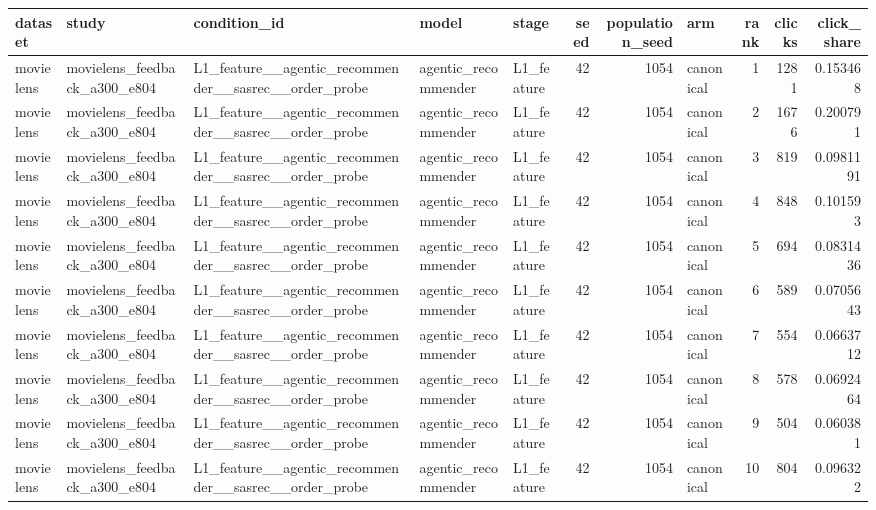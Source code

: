 \begin{table}[htbp!]
\centering
\small
\setlength{\tabcolsep}{3pt}
\renewcommand{\arraystretch}{1.1}
\begin{tabular}{lllllrrlrrr}
\hline
dataset & study & condition\_id & model & stage & seed & population\_seed & arm & rank & clicks & click\_share \\
\hline
movielens & movielens\_feedback\_a300\_e804 & L1\_feature\_\_agentic\_recommender\_\_sasrec\_\_order\_probe & agentic\_recommender & L1\_feature & 42 & 1054 & canonical & 1 & 1281 & 0.153468 \\
movielens & movielens\_feedback\_a300\_e804 & L1\_feature\_\_agentic\_recommender\_\_sasrec\_\_order\_probe & agentic\_recommender & L1\_feature & 42 & 1054 & canonical & 2 & 1676 & 0.200791 \\
movielens & movielens\_feedback\_a300\_e804 & L1\_feature\_\_agentic\_recommender\_\_sasrec\_\_order\_probe & agentic\_recommender & L1\_feature & 42 & 1054 & canonical & 3 & 819 & 0.0981191 \\
movielens & movielens\_feedback\_a300\_e804 & L1\_feature\_\_agentic\_recommender\_\_sasrec\_\_order\_probe & agentic\_recommender & L1\_feature & 42 & 1054 & canonical & 4 & 848 & 0.101593 \\
movielens & movielens\_feedback\_a300\_e804 & L1\_feature\_\_agentic\_recommender\_\_sasrec\_\_order\_probe & agentic\_recommender & L1\_feature & 42 & 1054 & canonical & 5 & 694 & 0.0831436 \\
movielens & movielens\_feedback\_a300\_e804 & L1\_feature\_\_agentic\_recommender\_\_sasrec\_\_order\_probe & agentic\_recommender & L1\_feature & 42 & 1054 & canonical & 6 & 589 & 0.0705643 \\
movielens & movielens\_feedback\_a300\_e804 & L1\_feature\_\_agentic\_recommender\_\_sasrec\_\_order\_probe & agentic\_recommender & L1\_feature & 42 & 1054 & canonical & 7 & 554 & 0.0663712 \\
movielens & movielens\_feedback\_a300\_e804 & L1\_feature\_\_agentic\_recommender\_\_sasrec\_\_order\_probe & agentic\_recommender & L1\_feature & 42 & 1054 & canonical & 8 & 578 & 0.0692464 \\
movielens & movielens\_feedback\_a300\_e804 & L1\_feature\_\_agentic\_recommender\_\_sasrec\_\_order\_probe & agentic\_recommender & L1\_feature & 42 & 1054 & canonical & 9 & 504 & 0.060381 \\
movielens & movielens\_feedback\_a300\_e804 & L1\_feature\_\_agentic\_recommender\_\_sasrec\_\_order\_probe & agentic\_recommender & L1\_feature & 42 & 1054 & canonical & 10 & 804 & 0.096322 \\

\end{tabular}
\end{table}
